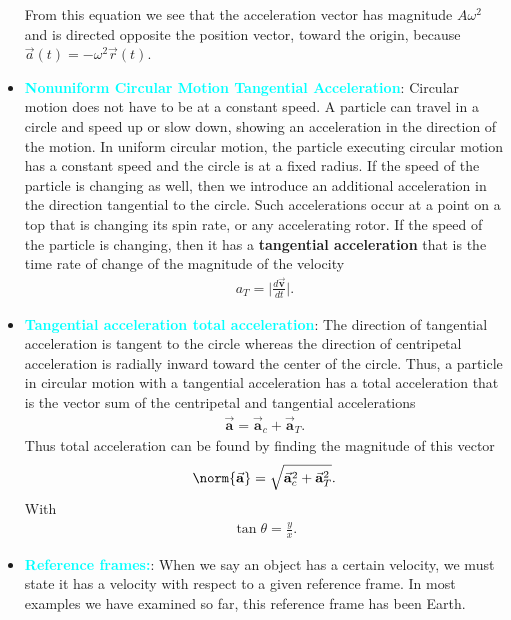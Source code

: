 \documentclass{report}
\begin{document}
\begin{itemize}
                From this equation we see that the acceleration vector has magnitude $A\omega^2$ and is directed opposite the position vector, toward the origin, because $\vec{a}(t) = -\omega^2 \vec{r}(t)$.
            \item \textbf{\textcolor{cyan}{Nonuniform Circular Motion Tangential Acceleration}}:
                Circular motion does not have to be at a constant speed. A particle can travel in a circle and speed up or slow down, showing an acceleration in the direction of the motion.
                \smallbreak \noindent
                In uniform circular motion, the particle executing circular motion has a constant speed and the circle is at a fixed radius. If the speed of the particle is changing as well, then we introduce an additional acceleration in the direction tangential to the circle. Such accelerations occur at a point on a top that is changing its spin rate, or any accelerating rotor.  If the speed of the particle is changing, then it has a \textbf{tangential acceleration} that is the time rate of change of the magnitude of the velocity
                \begin{align*}
                    a_{T} = \bigg\lvert  \frac{d\vec{\mathbf{v}}}{dt} \bigg\rvert
                .\end{align*}
            \item \textbf{\textcolor{cyan}{Tangential acceleration total acceleration}}: 
                The direction of tangential acceleration is tangent to the circle whereas the direction of centripetal acceleration is radially inward toward the center of the circle. Thus, a particle in circular motion with a tangential acceleration has a total acceleration that is the vector sum of the centripetal and tangential accelerations
                \begin{align*}
                    \vec{\mathbf{a}} = \vec{\mathbf{a}}_{c} + \vec{\mathbf{a}}_{T}
                .\end{align*}
                Thus total acceleration can be found by finding the magnitude of this vector
                \begin{align*}
                    \norm{\vec{\mathbf{a}}} = \sqrt{\vec{\mathbf{a}}_{c}^{2} + \vec{\mathbf{a}}_{T}^{2}}
                .\end{align*}
                With 
                \begin{align*}
                    \tan{\theta} = \frac{y}{x}
                .\end{align*}
            \item \textbf{\textcolor{cyan}{Reference frames:}}: When we say an object has a certain velocity, we must state it has a velocity with respect to a given reference frame. In most examples we have examined so far, this reference frame has been Earth.

\end{itemize}
\end{document}
